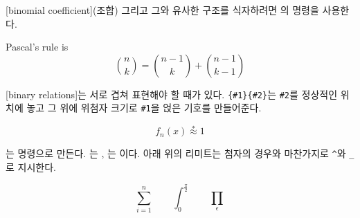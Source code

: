 [binomial coefficient](조합) 그리고 그와 유사한 구조를 식자하려면 의  명령을 사용한다.
\begin{example}
Pascal's rule is
\begin{equation*}
 \binom{n}{k} =\binom{n-1}{k}
 + \binom{n-1}{k-1}
\end{equation*}
\end{example}

[binary relations]는 서로 겹쳐 표현해야 할 때가 있다.
\verb|{#1}{#2}|는 \verb|#2|를 정상적인 위치에 놓고 그 위에 위첨자 크기로 \verb|#1|을 얹은 기호를 만들어준다.
\begin{example}
\begin{equation*}
 f_n(x) \stackrel{*}{\approx} 1
\end{equation*}
\end{example}

는  명령으로 만든다.
는 ,
는 이다.
아래 위의 리미트는 첨자의 경우와 마찬가지로 \verb|^|와 \verb|_|로 지시한다.
\begin{example}
\begin{equation*}
\sum_{i=1}^n \qquad
\int_0^{\frac{\pi}{2}} \qquad
\prod_\epsilon
\end{equation*}
\end{example}

